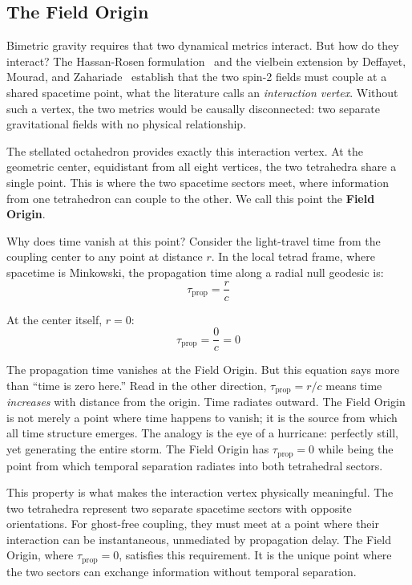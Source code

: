 \documentclass[aps,prd,preprint,superscriptaddress,showpacs,preprintnumbers,amsmath,amssymb,nofootinbib]{revtex4-2}
\begin{document}
\subsection{The Field Origin}
\label{subsec:origin}

Bimetric gravity requires that two dynamical metrics interact. But how do they interact? The Hassan-Rosen formulation~\cite{hassan2012} and the vielbein extension by Deffayet, Mourad, and Zahariade~\cite{deffayet2013} establish that the two spin-2 fields must couple at a shared spacetime point, what the literature calls an \emph{interaction vertex}. Without such a vertex, the two metrics would be causally disconnected: two separate gravitational fields with no physical relationship.

The stellated octahedron provides exactly this interaction vertex. At the geometric center, equidistant from all eight vertices, the two tetrahedra share a single point. This is where the two spacetime sectors meet, where information from one tetrahedron can couple to the other. We call this point the \textbf{Field Origin}.

Why does time vanish at this point? Consider the light-travel time from the coupling center to any point at distance $r$. In the local tetrad frame, where spacetime is Minkowski, the propagation time along a radial null geodesic is:
\begin{equation}
\tau_{\text{prop}} = \frac{r}{c}
\end{equation}

At the center itself, $r = 0$:
\begin{equation}
\tau_{\text{prop}} = \frac{0}{c} = 0
\end{equation}

The propagation time vanishes at the Field Origin. But this equation says more than ``time is zero here.'' Read in the other direction, $\tau_{\text{prop}} = r/c$ means time \emph{increases} with distance from the origin. Time radiates outward. The Field Origin is not merely a point where time happens to vanish; it is the source from which all time structure emerges. The analogy is the eye of a hurricane: perfectly still, yet generating the entire storm. The Field Origin has $\tau_{\text{prop}} = 0$ while being the point from which temporal separation radiates into both tetrahedral sectors.

This property is what makes the interaction vertex physically meaningful. The two tetrahedra represent two separate spacetime sectors with opposite orientations. For ghost-free coupling, they must meet at a point where their interaction can be instantaneous, unmediated by propagation delay. The Field Origin, where $\tau_{\text{prop}} = 0$, satisfies this requirement. It is the unique point where the two sectors can exchange information without temporal separation.
\end{document}
